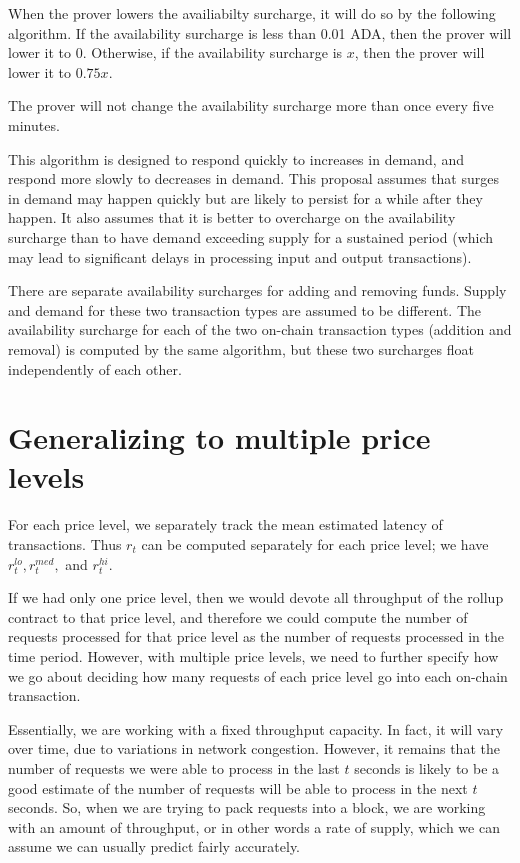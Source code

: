 \documentclass[12pt]{article}
\begin{document}
When the prover lowers the availiabilty surcharge, it will do so by the following algorithm. If the availability surcharge is less than 0.01 ADA, then the prover will lower it to 0. Otherwise, if the availability surcharge is $x$, then the prover will lower it to $0.75x$.

The prover will not change the availability surcharge more than once every five minutes.

This algorithm is designed to respond quickly to increases in demand, and respond more slowly to decreases in demand. This proposal assumes that surges in demand may happen quickly but are likely to persist for a while after they happen. It also assumes that it is better to overcharge on the availability surcharge than to have demand exceeding supply for a sustained period (which may lead to significant delays in processing input and output transactions).

There are separate availability surcharges for adding and removing funds. Supply and demand for these two transaction types are assumed to be different. The availability surcharge for each of the two on-chain transaction types (addition and removal) is computed by the same algorithm, but these two surcharges float independently of each other.

\section{Generalizing to multiple price levels}

For each price level, we separately track the mean estimated latency of transactions. Thus $r_t$ can be computed separately for each price level; we have $r_t^{lo}, r_t^{med},$ and $r_t^{hi}$.

If we had only one price level, then we would devote all throughput of the rollup contract to that price level, and therefore we could compute the number of requests processed for that price level as the number of requests processed in the time period. However, with multiple price levels, we need to further specify how we go about deciding how many requests of each price level go into each on-chain transaction.

Essentially, we are working with a fixed throughput capacity. In fact, it will vary over time, due to variations in network congestion. However, it remains that the number of requests we were able to process in the last $t$ seconds is likely to be a good estimate of the number of requests will be able to process in the next $t$ seconds. So, when we are trying to pack requests into a block, we are working with an amount of throughput, or in other words a rate of supply, which we can assume we can usually predict fairly accurately. 
\end{document}
